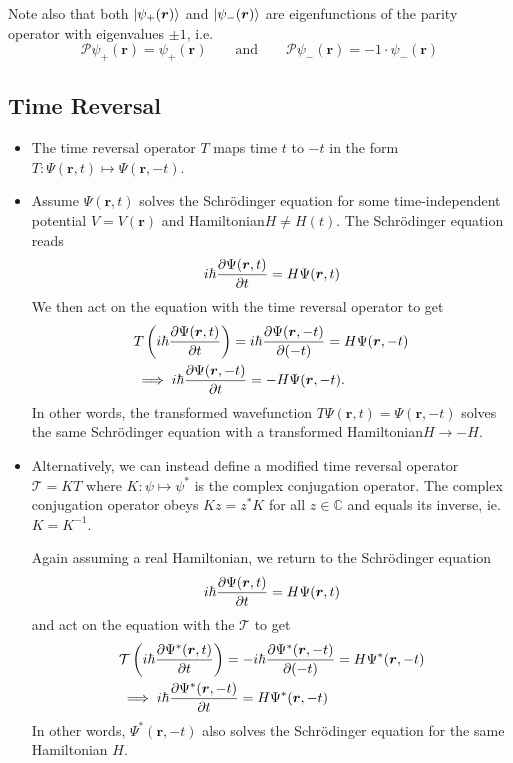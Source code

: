 \documentclass[11pt, a4paper]{article}
\newcommand{\eqtext}[1]{\qquad \text{#1} \qquad}
\newcommand{\Schro}{Schr\"{o}dinger\xspace}
\newcommand{\Ham}{Hamiltonian\xspace}
\renewcommand{\vec}[1]{\bm{#1}}  %
\renewcommand{\r}{\vec{r}}  %
\newcommand{\T}{\mathcal{T}}  %
\newcommand{\Par}{\mathcal{P}}  %
\newcommand{\p}{\psi}  %
\renewcommand{\P}{\Psi}  %
\renewcommand{\k}[1]{\ket{#1}}
\begin{document}
\begin{itemize}
	Note also that both $  \ket{\p_{+}(\r)} $ and $ \k{\p_{-}(\r)} $ are eigenfunctions of the parity operator with eigenvalues $ \pm 1 $, i.e.
	\begin{equation*}
		\Par \p_{+}(\r) =  \p_{+}(\r) \eqtext{and} \Par \p_{-}(\r) =  -1 \cdot \p_{-}(\r)
	\end{equation*}
	
\end{itemize}

\subsection{Time Reversal}
\begin{itemize}
	\item The time reversal operator $ T $ maps time $ t $ to $ -t $ in the form $ T: \P(\r, t) \mapsto \P(\r, -t) $.
	
	\item Assume $ \P(\r, t) $ solves the \Schro equation for some time-independent potential $ V = V(\r) $ and \Ham $ H \neq H(t) $. The \Schro equation reads
	\begin{equation*}
		i \hbar \pdv{\P(\r, t)}{t} = H \P(\r, t)
	\end{equation*}
	We then act on the equation with the time reversal operator to get
	\begin{align*}
		& T\left(i \hbar \pdv{\P(\r, t)}{t}\right) = i \hbar \pdv{\P(\r, -t)}{(-t)} = H \P(\r, -t)  \\
		& \implies i \hbar \pdv{\P(\r, -t)}{t} = -H \P(\r, -t).
	\end{align*}
	In other words, the transformed wavefunction $ T\P(\r, t) = \P(\r, -t) $ solves the same \Schro equation with a transformed \Ham $ H \to - H $.
	
	\item Alternatively, we can instead define a modified time reversal operator $ \T = KT $ where $ K : \psi \mapsto \psi^{*} $ is the complex conjugation operator. The complex conjugation operator obeys $ K z = z^{*}K $ for all $ z \in \mathbb{C} $ and equals its inverse, ie. $ K = K^{-1} $. 
	
	Again assuming a real Hamiltonian, we return to the \Schro equation
	\begin{equation*}
		i \hbar \pdv{\P(\r, t)}{t} = H \P(\r, t) 
	\end{equation*}
	and act on the equation with the $ \T $ to get
	\begin{align*}
		& \T\left(i \hbar \pdv{\P^{*}(\r, t)}{t}\right) = -i \hbar \pdv{\P^{*}(\r, -t)}{(-t)} = H \P^{*}(\r, -t) \\
		& \implies i \hbar \pdv{\P^{*}(\r, -t)}{t} = H \P^{*}(\r, -t) 
	\end{align*}
	In other words, $ \P^{*}(\r, -t) $ also solves the \Schro equation for the same Hamiltonian $ H $. 
	

\end{itemize}
\end{document}
